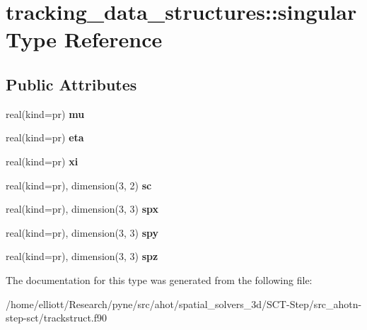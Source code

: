 \hypertarget{structtracking__data__structures_1_1singular}{\section{tracking\-\_\-data\-\_\-structures\-:\-:singular Type Reference}
\label{structtracking__data__structures_1_1singular}
}
\subsection*{Public Attributes}
\begin{DoxyCompactItemize}
\item 
\hypertarget{structtracking__data__structures_1_1singular_acd79fe7d9374778a1a073f01d33bc323}{real(kind=pr) {\bfseries mu}}\label{structtracking__data__structures_1_1singular_acd79fe7d9374778a1a073f01d33bc323}

\item 
\hypertarget{structtracking__data__structures_1_1singular_a8015e49ee70edd759eb801446b40de59}{real(kind=pr) {\bfseries eta}}\label{structtracking__data__structures_1_1singular_a8015e49ee70edd759eb801446b40de59}

\item 
\hypertarget{structtracking__data__structures_1_1singular_ac42e62b9f85705c6e68a6d07bc6c889c}{real(kind=pr) {\bfseries xi}}\label{structtracking__data__structures_1_1singular_ac42e62b9f85705c6e68a6d07bc6c889c}

\item 
\hypertarget{structtracking__data__structures_1_1singular_ae99e040b2944a8f103cb730cef072f7b}{real(kind=pr), dimension(3, 2) {\bfseries sc}}\label{structtracking__data__structures_1_1singular_ae99e040b2944a8f103cb730cef072f7b}

\item 
\hypertarget{structtracking__data__structures_1_1singular_aeb81711c1d7153fe3dc8eae682f08134}{real(kind=pr), dimension(3, 3) {\bfseries spx}}\label{structtracking__data__structures_1_1singular_aeb81711c1d7153fe3dc8eae682f08134}

\item 
\hypertarget{structtracking__data__structures_1_1singular_ab7f1cf71b301b3dd7b30004bb3fecbea}{real(kind=pr), dimension(3, 3) {\bfseries spy}}\label{structtracking__data__structures_1_1singular_ab7f1cf71b301b3dd7b30004bb3fecbea}

\item 
\hypertarget{structtracking__data__structures_1_1singular_a5bfe4d508ca8ba24ddd3c14c20c03086}{real(kind=pr), dimension(3, 3) {\bfseries spz}}\label{structtracking__data__structures_1_1singular_a5bfe4d508ca8ba24ddd3c14c20c03086}

\end{DoxyCompactItemize}


The documentation for this type was generated from the following file\-:\begin{DoxyCompactItemize}
\item 
/home/elliott/\-Research/pyne/src/ahot/spatial\-\_\-solvers\-\_\-3d/\-S\-C\-T-\/\-Step/src\-\_\-ahotn-\/step-\/sct/trackstruct.\-f90\end{DoxyCompactItemize}
